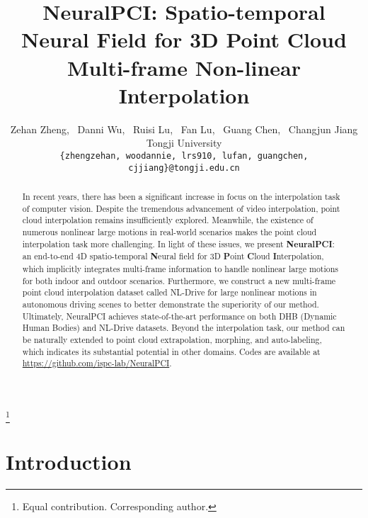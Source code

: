\documentclass[10pt,twocolumn,letterpaper]{article}
\begin{document}
\title{NeuralPCI: Spatio-temporal Neural Field for 3D Point Cloud Multi-frame Non-linear Interpolation}

\author{Zehan Zheng,~ Danni Wu,~ Ruisi Lu,~ Fan Lu,~ Guang Chen,~ Changjun Jiang\\
Tongji University\\
{\tt\small \{zhengzehan, woodannie, lrs910, lufan, guangchen, cjjiang\}@tongji.edu.cn}}
\maketitle

\renewcommand{\thefootnote}{}
\footnote{ Equal contribution.  Corresponding author.}


\vspace{-0.5cm}

\begin{abstract}
\vspace{-0.1cm}
In recent years, there has been a significant increase in focus on the interpolation task of computer vision. Despite the tremendous advancement of video interpolation, point cloud interpolation remains insufficiently explored. Meanwhile, the existence of numerous nonlinear large motions in real-world scenarios makes the point cloud interpolation task more challenging. In light of these issues, we present \textbf{NeuralPCI}: an end-to-end 4D spatio-temporal \textbf{N}eural field for 3D \textbf{P}oint \textbf{C}loud \textbf{I}nterpolation, which implicitly integrates multi-frame information to handle nonlinear large motions for both indoor and outdoor scenarios. Furthermore, we construct a new multi-frame point cloud interpolation dataset called NL-Drive for large nonlinear motions in autonomous driving scenes to better demonstrate the superiority of our method. Ultimately, NeuralPCI achieves state-of-the-art performance on both DHB (Dynamic Human Bodies) and NL-Drive datasets. Beyond the interpolation task, our method can be naturally extended to point cloud extrapolation, morphing, and auto-labeling, which indicates its substantial potential in other domains. Codes are available at \url{https://github.com/ispc-lab/NeuralPCI}.  

\end{abstract}

\vspace{-0.1cm}


\section{Introduction}
\label{sec:intro}
\end{document}

